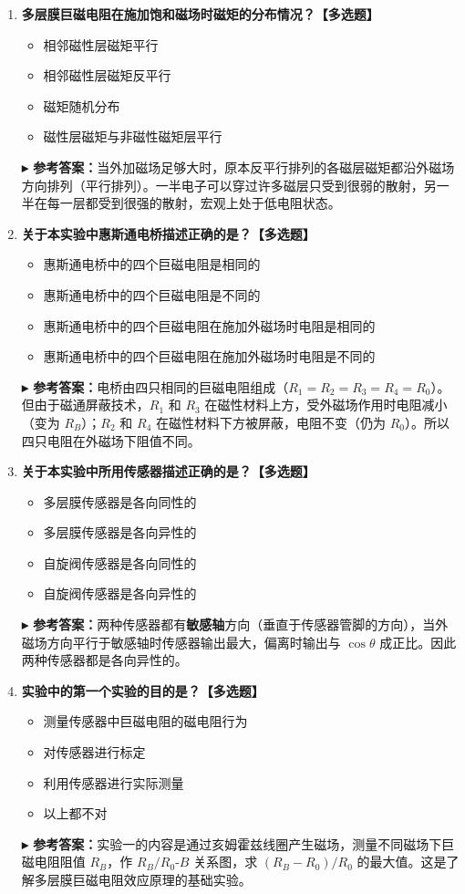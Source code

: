 \documentclass[12pt,a4paper]{article}
\newcommand{\answer}[1]{\vspace{2pt}\noindent\textbf{\color{teal!80!black}▸ 参考答案：}#1\vspace{4pt}}
\begin{document}
\begin{enumerate}[label=\arabic*.]
    \item \textbf{多层膜巨磁电阻在施加饱和磁场时磁矩的分布情况？【多选题】}
    \begin{itemize}
        \item[\checkmark] 相邻磁性层磁矩平行
        \item 相邻磁性层磁矩反平行
        \item 磁矩随机分布
        \item 磁性层磁矩与非磁性磁矩层平行
    \end{itemize}
    \answer{当外加磁场足够大时，原本反平行排列的各磁层磁矩都沿外磁场方向排列（平行排列）。一半电子可以穿过许多磁层只受到很弱的散射，另一半在每一层都受到很强的散射，宏观上处于低电阻状态。}

    \item \textbf{关于本实验中惠斯通电桥描述正确的是？【多选题】}
    \begin{itemize}
        \item[\checkmark] 惠斯通电桥中的四个巨磁电阻是相同的
        \item 惠斯通电桥中的四个巨磁电阻是不同的
        \item 惠斯通电桥中的四个巨磁电阻在施加外磁场时电阻是相同的
        \item[\checkmark] 惠斯通电桥中的四个巨磁电阻在施加外磁场时电阻是不同的
    \end{itemize}
    \answer{电桥由四只相同的巨磁电阻组成（$R_1=R_2=R_3=R_4=R_0$）。但由于磁通屏蔽技术，$R_1$ 和 $R_3$ 在磁性材料上方，受外磁场作用时电阻减小（变为 $R_B$）；$R_2$ 和 $R_4$ 在磁性材料下方被屏蔽，电阻不变（仍为 $R_0$）。所以四只电阻在外磁场下阻值不同。}

    \item \textbf{关于本实验中所用传感器描述正确的是？【多选题】}
    \begin{itemize}
        \item 多层膜传感器是各向同性的
        \item[\checkmark] 多层膜传感器是各向异性的
        \item 自旋阀传感器是各向同性的
        \item[\checkmark] 自旋阀传感器是各向异性的
    \end{itemize}
    \answer{两种传感器都有\textbf{敏感轴}方向（垂直于传感器管脚的方向），当外磁场方向平行于敏感轴时传感器输出最大，偏离时输出与 $\cos\theta$ 成正比。因此两种传感器都是各向异性的。}

    \item \textbf{实验中的第一个实验的目的是？【多选题】}
    \begin{itemize}
        \item[\checkmark] 测量传感器中巨磁电阻的磁电阻行为
        \item 对传感器进行标定
        \item 利用传感器进行实际测量
        \item 以上都不对
    \end{itemize}
    \answer{实验一的内容是通过亥姆霍兹线圈产生磁场，测量不同磁场下巨磁电阻阻值 $R_B$，作 $R_B/R_0$-$B$ 关系图，求 $(R_B-R_0)/R_0$ 的最大值。这是了解多层膜巨磁电阻效应原理的基础实验。}


\end{enumerate}
\end{document}
